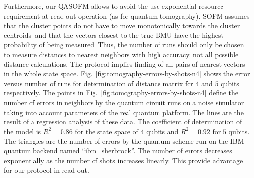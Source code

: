 \documentclass[pra,showkeys,twocolumn,showpacs,aps,10pt]{revtex4-1}
\begin{document}
Furthermore, our QASOFM allows to avoid the use exponential resource requirement at read-out operation (as for quantum tomography). 
SOFM assumes that the cluster points do not have to move monotonically towards the cluster centroids,
and that the vectors closest to the true BMU have the highest probability of being measured.
Thus, the number of runs should only be chosen to measure distances to nearest neighbors with high accuracy, not all possible distance calculations. The protocol implies finding of all pairs of nearest vectors in the whole state space.
Fig.~\ref{fig:tomography-errors-by-shots-n4} shows the error versus number of runs for determination of distance matrix for $4$  and $5$ qubits respectively.
The points in Fig.~\ref{fig:tomography-errors-by-shots-n4} define the number of errors in neighbors
by the quantum circuit runs on a noise simulator taking into account parameters of the real quantum platform.
The lines are the result of a regression analysis of these data.
The coefficient of determination of the model is $R^2 = 0.86$ for the state space of $4$ qubits and $R^2 = 0.92$ for $5$ qubits.
The triangles are the number of errors by the quantum scheme run on the IBM quantum backend named ``ibm\_sherbrook''.
The number of errors decreases exponentially as the number of shots increases linearly. This provide advantage for our protocol in read out.
\end{document}
